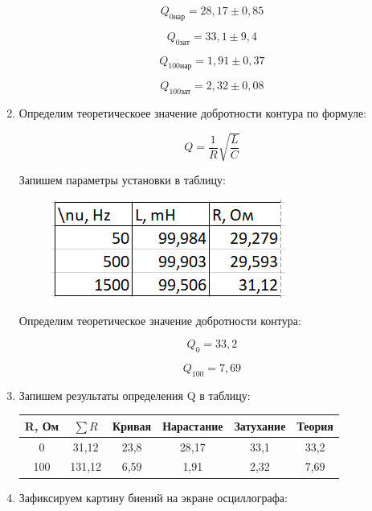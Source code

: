 \documentclass[a4paper, 12pt]{article}%
\begin{document}
\begin{enumerate}
\[Q_{0\text{нар}} = 28,17 \pm 0,85\]

\[Q_{0\text{зат}} = 33,1 \pm 9,4\]

\[Q_{100\text{нар}} = 1,91 \pm 0,37\]

\[Q_{100\text{зат}} = 2,32 \pm 0,08\]

\item Определим теоретическоее значение добротности контура по формуле:

\[Q = \frac{1}{R}\sqrt{\frac{L}{C}}\]

Запишем параметры установки в таблицу:

\begin{figure}[h!]
\centering
\includegraphics[scale=1]{table5.png}
\label{fig:Image1}
\end{figure}

Определим теоретическое значение добротности контура:

\[Q_0 =  33,2\]

\[Q_{100} = 7,69\]

\item Запишем результаты определения Q в таблицу:

\begin{tabular}{|c|c|c|c|c|c|}
\hline 
R, Ом & $\sum R$  & Кривая & Нарастание & Затухание & Теория \\ 
\hline 
0 & 31,12 &   23,8 & 28,17 & 33,1 & 33,2 \\ 
\hline 
100 & 131,12 & 6,59 & 1,91 & 2,32 & 7,69 \\ 
\hline 
\end{tabular} 

\item Зафиксируем картину биений на экране осциллографа:


\end{enumerate}
\end{document}
